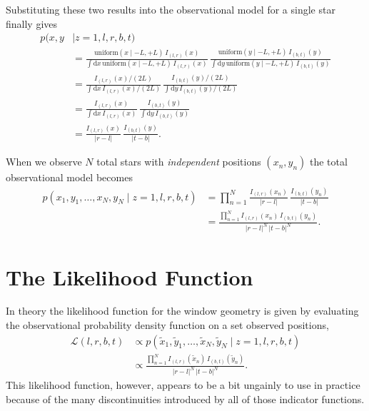 \documentclass[
  letterpaper,
  DIV=11,
  numbers=noendperiod]{scrartcl}
\begin{document}
Substituting these two results into the observational model for a single
star finally gives \begin{align*}
p(x, y &\mid z = 1, l, r, b, t)
\\
&=
\frac{ \text{uniform}(x \mid -L, +L) \, I_{(l, r)}(x) }
{ \int \mathrm{d} x \, \text{uniform}(x \mid -L, +L) \, I_{(l, r)}(x) } \,
\frac{ \text{uniform}(y \mid -L, +L) \, I_{(b, t)}(y) }
{ \int \mathrm{d} y \, \text{uniform}(y \mid -L, +L) \, I_{(b, t)}(y) }
\\
&=
\frac{ I_{(l, r)}(x) / (2L) }{ \int \mathrm{d} x \, I_{(l, r)}(x) / (2L) } \,
\frac{ I_{(b, t)}(y) / (2L) }{ \int \mathrm{d} y \, I_{(b, t)}(y) / (2L) }
\\
&=
\frac{ I_{(l, r)}(x) }{ \int \mathrm{d} x \, I_{(l, r)}(x) } \,
\frac{ I_{(b, t)}(y) }{ \int \mathrm{d} y \, I_{(b, t)}(y) }
\\
&=
\frac{ I_{(l, r)}(x) }{ | r - l | } \,
\frac{ I_{(b, t)}(y) }{ | t - b | }.
\end{align*}

When we observe \(N\) total stars with \emph{independent} positions
\((x_{n}, y_{n})\) the total observational model becomes \begin{align*}
p(x_{1}, y_{1}, \ldots, x_{N}, y_{N} \mid z = 1, l, r, b, t)
&=
\prod_{n = 1}^{N} \frac{ I_{(l, r)}(x_{n}) }{ | r - l | } \,
                  \frac{ I_{(b, t)}(y_{n}) }{ | t - b | }
\\
&=
\frac{ \prod_{n = 1}^{N} I_{(l, r)}(x_{n}) \, I_{(b, t)}(y_{n}) }
{ | r - l |^{N} \, | t - b |^{N} }.
\end{align*}

\section{The Likelihood Function}\label{the-likelihood-function}

In theory the likelihood function for the window geometry is given by
evaluating the observational probability density function on a set
observed positions, \begin{align*}
\mathcal{L}(l, r, b, t)
&\propto
p(\tilde{x}_{1}, \tilde{y}_{1}, \ldots, \tilde{x}_{N}, \tilde{y}_{N} \mid
  z = 1, l, r, b, t)
\\
&\propto
\frac{
  \prod_{n = 1}^{N} I_{(l, r)}( \tilde{x}_{n}) \, I_{(b, t)}( \tilde{y}_{n})
}
{
  | r - l |^{N} \, | t - b |^{N}
}.
\end{align*} This likelihood function, however, appears to be a bit
ungainly to use in practice because of the many discontinuities
introduced by all of those indicator functions.
\end{document}
